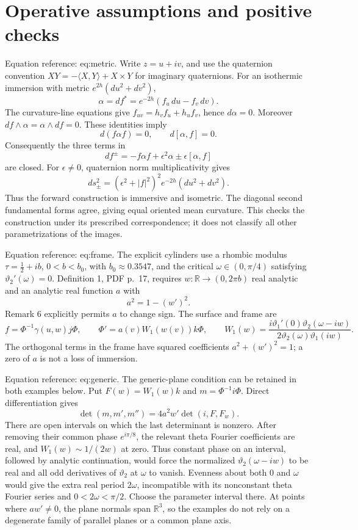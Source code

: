 \documentclass[10pt]{article}
\begin{document}
\section*{Operative assumptions and positive checks}
Equation reference: eq:metric. Write \(z=u+iv\), and use the quaternion convention \(XY=-\langle X,Y\rangle+X\times Y\) for imaginary quaternions. For an isothermic immersion with metric \(e^{2h}(du^2+dv^2)\), \[\alpha=df^*=e^{-2h}(f_u\,du-f_v\,dv).\] The curvature-line equations give \(f_{uv}=h_vf_u+h_uf_v\), hence \(d\alpha=0\). Moreover \(df\wedge\alpha=\alpha\wedge df=0\). These identities imply \[d(f\alpha f)=0,\qquad d[\alpha,f]=0.\] Consequently the three terms in \[df^\pm=-f\alpha f+\epsilon^2\alpha
             \pm\epsilon[\alpha,f]\] are closed. For \(\epsilon\ne0\), quaternion norm multiplicativity gives \[
 ds_\pm^2=(\epsilon^2+|f|^2)^2 e^{-2h}(du^2+dv^2).\] Thus the forward construction is immersive and isometric. The diagonal second fundamental forms agree, giving equal oriented mean curvature. This checks the construction under its prescribed correspondence; it does not classify all other parametrizations of the images.\par
Equation reference: eq:frame. The explicit cylinders use a rhombic modulus \(\tau=\frac12+i b\), \(0<b<b_0\), with \(b_0\approx0.3547\), and the critical \(\omega\in(0,\pi/4)\) satisfying \(\vartheta_2'(\omega)=0\). Definition 1, PDF p. 17, requires \(w:\mathbb R\to(0,2\pi b)\) real analytic and an analytic real function \(a\) with \[a^2=1-(w')^2.\] Remark 6 explicitly permits \(a\) to change sign. The surface and frame are \[
 f=\Phi^{-1}\gamma(u,w)j\Phi,\qquad
 \Phi' =a(v)W_1(w(v))k\Phi,\qquad
 W_1(w)=\frac{i\vartheta_1'(0)\vartheta_2(\omega-iw)}
                    {2\vartheta_2(\omega)\vartheta_1(iw)}.\] The orthogonal terms in the frame have squared coefficients \(a^2+(w')^2=1\); a zero of \(a\) is not a loss of immersion.\par
Equation reference: eq:generic. The generic-plane condition can be retained in both examples below. Put \(F(w)=W_1(w)k\) and \(m=\Phi^{-1}i\Phi\). Direct differentiation gives \[
 \det(m,m',m'')=4a^2w'\det(i,F,F_w).\] There are open intervals on which the last determinant is nonzero. After removing their common phase \(e^{i\pi/8}\), the relevant theta Fourier coefficients are real, and \(W_1(w)\sim1/(2w)\) at zero. Thus constant phase on an interval, followed by analytic continuation, would force the normalized \(\vartheta_2(\omega-iw)\) to be real and all odd derivatives of \(\vartheta_2\) at \(\omega\) to vanish. Evenness about both \(0\) and \(\omega\) would give the extra real period \(2\omega\), incompatible with its nonconstant theta Fourier series and \(0<2\omega<\pi/2\). Choose the parameter interval there. At points where \(aw'\ne0\), the plane normals span \(\mathbb R^3\), so the examples do not rely on a degenerate family of parallel planes or a common plane axis.\par
\end{document}
